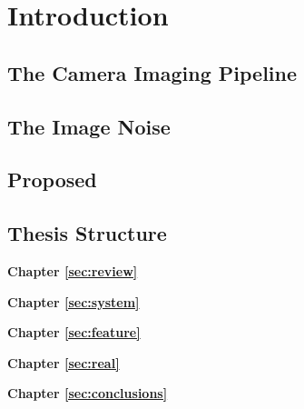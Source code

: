 %
\chapter{Introduction}
\label{sec:intro}


\blindtext

\section{The Camera Imaging Pipeline}
\label{sec:intro:general}

\blindtext

\section{The Image Noise}
\label{sec:intro:current}

\blindtext

\section{Proposed}
\label{sec:intro:new}

\blindtext

\section{Thesis Structure}
\label{sec:intro:structure}

\textbf{Chapter \ref{sec:review}} \\[0.2em]
\blindtext

\textbf{Chapter \ref{sec:system}} \\[0.2em]
\blindtext

\textbf{Chapter \ref{sec:feature}} \\[0.2em]
\blindtext

\textbf{Chapter \ref{sec:real}} \\[0.2em]
\blindtext

\textbf{Chapter \ref{sec:conclusions}} \\[0.2em]
\blindtext

